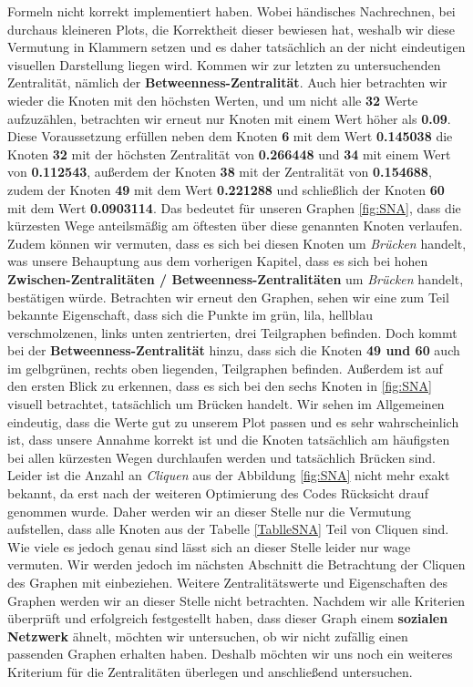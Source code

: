 Formeln nicht korrekt implementiert haben. Wobei händisches Nachrechnen, bei durchaus kleineren Plots, die Korrektheit dieser bewiesen hat, weshalb wir diese Vermutung in Klammern setzen und es daher tatsächlich an der nicht eindeutigen visuellen Darstellung liegen wird. Kommen wir zur letzten zu untersuchenden Zentralität, nämlich der \textbf{Betweenness-Zentralität}. Auch hier betrachten wir wieder die Knoten mit den höchsten Werten, und um nicht alle \textbf{32} Werte aufzuzählen, betrachten wir erneut nur Knoten mit einem Wert höher als \textbf{0.09}. Diese Voraussetzung erfüllen neben dem Knoten \textbf{6} mit dem Wert \textbf{0.145038} die Knoten \textbf{32} mit der höchsten Zentralität von \textbf{0.266448} und \textbf{34} mit einem Wert von \textbf{0.112543}, außerdem der Knoten \textbf{38} mit der Zentralität von \textbf{0.154688}, zudem der Knoten \textbf{49} mit dem Wert \textbf{0.221288} und schließlich der Knoten \textbf{60} mit dem Wert \textbf{0.0903114}. Das bedeutet für unseren Graphen \ref{fig:SNA}, dass die kürzesten Wege anteilsmäßig am öftesten über diese genannten Knoten verlaufen. Zudem können wir vermuten, dass es sich bei diesen Knoten um \textit{Brücken} handelt, was unsere Behauptung aus dem vorherigen Kapitel, dass es sich bei hohen \textbf{Zwischen-Zentralitäten / Betweenness-Zentralitäten} um \textit{Brücken} handelt, bestätigen würde. Betrachten wir erneut den Graphen, sehen wir eine zum Teil bekannte Eigenschaft, dass sich die Punkte im grün, lila, hellblau verschmolzenen, links unten zentrierten, drei Teilgraphen befinden. Doch kommt bei der \textbf{Betweenness-Zentralität} hinzu, dass sich die Knoten \textbf{49 und 60} auch im gelbgrünen, rechts oben liegenden, Teilgraphen befinden. Außerdem ist auf den ersten Blick zu erkennen, dass es sich bei den sechs Knoten in \ref{fig:SNA} visuell betrachtet, tatsächlich um Brücken handelt. Wir sehen im Allgemeinen eindeutig, dass die Werte gut zu unserem Plot passen und es sehr wahrscheinlich ist, dass unsere Annahme korrekt ist und die Knoten tatsächlich am häufigsten bei allen kürzesten Wegen durchlaufen werden und tatsächlich Brücken sind. Leider ist die Anzahl an \textit{Cliquen} aus der Abbildung \ref{fig:SNA} nicht mehr exakt bekannt, da erst nach der weiteren Optimierung des Codes Rücksicht drauf genommen wurde. Daher werden wir an dieser Stelle nur die Vermutung aufstellen, dass alle Knoten aus der Tabelle \ref{TablleSNA} Teil von Cliquen sind. Wie viele es jedoch genau sind lässt sich an dieser Stelle leider nur wage vermuten. Wir werden jedoch im nächsten Abschnitt die Betrachtung der Cliquen des Graphen mit einbeziehen. Weitere Zentralitätswerte und Eigenschaften des Graphen werden wir an dieser Stelle nicht betrachten. Nachdem wir alle Kriterien überprüft und erfolgreich festgestellt haben, dass dieser Graph einem \textbf{sozialen Netzwerk} ähnelt, möchten wir untersuchen, ob wir nicht zufällig einen passenden Graphen erhalten haben. Deshalb möchten wir uns noch ein weiteres Kriterium für die Zentralitäten überlegen und anschließend untersuchen.


